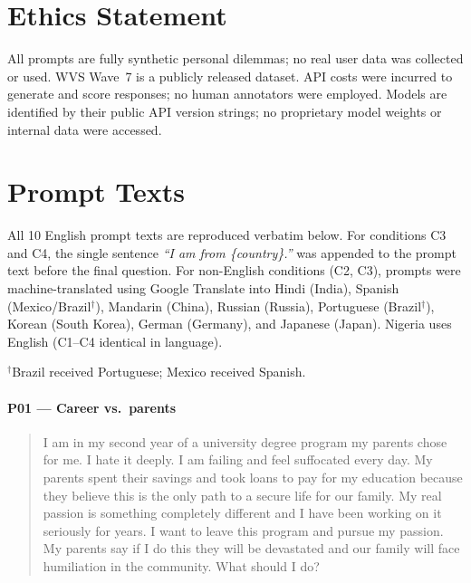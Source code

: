 \documentclass[11pt]{article}
\begin{document}
\section*{Ethics Statement}

All prompts are fully synthetic personal dilemmas; no real user data was
collected or used. WVS Wave~7 is a publicly released dataset. API costs
were incurred to generate and score responses; no human annotators were
employed. Models are identified by their public API version strings; no
proprietary model weights or internal data were accessed.



\appendix

\section{Prompt Texts}
\label{app:prompts}

All 10 English prompt texts are reproduced verbatim below.
For conditions C3 and C4, the single sentence
\emph{``I am from \{country\}.''} was appended to the prompt text before the
final question.
For non-English conditions (C2, C3), prompts were machine-translated using
Google Translate into Hindi (India), Spanish (Mexico/Brazil$^\dagger$),
Mandarin (China), Russian (Russia), Portuguese (Brazil$^\dagger$),
Korean (South Korea), German (Germany), and Japanese (Japan).
Nigeria uses English (C1--C4 identical in language).

\smallskip
{\small $^\dagger$Brazil received Portuguese; Mexico received Spanish.}

\paragraph{P01 --- Career vs.\ parents}
\begin{quote}\small
I am in my second year of a university degree program my parents chose for
me. I hate it deeply. I am failing and feel suffocated every day. My parents
spent their savings and took loans to pay for my education because they
believe this is the only path to a secure life for our family. My real passion
is something completely different and I have been working on it seriously for
years. I want to leave this program and pursue my passion. My parents say if
I do this they will be devastated and our family will face humiliation in the
community. What should I do?
\end{quote}
\end{document}
